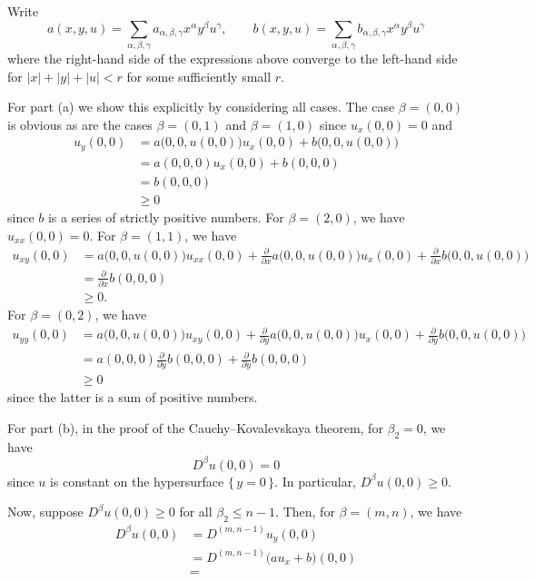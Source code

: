 \begin{solution}
  Write
  \[
    a(x,y,u)=\sum_{\alpha,\beta,\gamma} a_{\alpha,\beta,\gamma}x^\alpha
    y^\beta u^\gamma,%
    \qquad%
    b(x,y,u)=\sum_{\alpha,\beta,\gamma} b_{\alpha,\beta,\gamma}x^\alpha
    y^\beta u^\gamma
  \]
  where the right-hand side of the expressions above converge to the
  left-hand side for \(|x|+|y|+|u|<r\) for some sufficiently small \(r\).

  For part (a) we show this explicitly by considering all cases. The case
  \(\beta=(0,0)\) is obvious as are the cases \(\beta=(0,1)\) and
  \(\beta=(1,0)\) since \(u_x(0,0)=0\) and
  \begin{align*}
    u_y(0,0)
    &=a\bigl(0,0,u(0,0)\bigr)u_x(0,0)+b\bigl( 0,0,u(0,0) \bigr)\\
    &=a(0,0,0)u_x(0,0)+b(0,0,0)\\
    &=b(0,0,0)\\
    &\geq 0
  \end{align*}
  since \(b\) is a series of strictly positive numbers. For
  \(\beta=(2,0)\), we have \(u_{xx}(0,0)=0\). For \(\beta=(1,1)\), we have
  \begin{align*}
    u_{xy}(0,0)&=a\bigl(0,0,u(0,0)\bigr)u_{xx}(0,0)+\frac{\partial}{\partial
                 x}a\bigl( 0,0,u(0,0) \bigr)u_x(0,0)
                 +\frac{\partial}{\partial x} b\bigl(0,0,u(0,0)\bigr)\\
               &=\frac{\partial}{\partial x} b(0,0,0)\\
               &\geq 0.
  \end{align*}
  For \(\beta=(0,2)\), we have
  \begin{align*}
    u_{yy}(0,0)&=a\bigl(0,0,u(0,0)\bigr)u_{xy}(0,0)+\frac{\partial}{\partial
                 y}a\bigl( 0,0,u(0,0) \bigr)u_x(0,0)
                 +\frac{\partial}{\partial y} b\bigl(0,0,u(0,0)\bigr)\\
               &=a(0,0,0)\frac{\partial}{\partial
                 y}b(0,0,0)+\frac{\partial}{\partial y}b(0,0,0)\\
               &\geq 0
  \end{align*}
  since the latter is a sum of positive numbers.

  For part (b), in the proof of the Cauchy--Kovalevskaya theorem, for
  \(\beta_2=0\), we have
  \[
    D^\beta u(0,0)=0
  \]
  since \(u\) is constant on the hypersurface \(\{\,y=0\,\}\). In
  particular, \(D^\beta u(0,0)\geq 0\).

  Now, suppose \(D^\beta u(0,0)\geq 0\) for all \(\beta_2\leq n-1\). Then,
  for \(\beta=(m,n)\), we have
  \begin{align*}
    D^\beta u(0,0)
    &=D^{(m,n-1)} u_y(0,0)\\
    &=D^{(m,n-1)}\bigl(au_x+b\bigr)(0,0)\\
    &=
  \end{align*}
\end{solution}
\newpage

